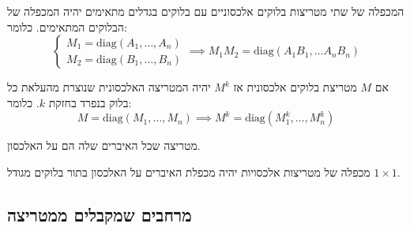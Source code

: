 \documentclass{tstextbook}
\begin{document}
\begin{proposition}
המכפלה של שתי מטריצות בלוקים אלכסוניים עם בלוקים בגדלים מתאימים יהיה המכפלה של הבלוקים המתאימים. כלומר:
$$\begin{cases}M_{1}=\mathrm{diag}\left( A_{1},\dots,A_{n} \right) \\M_{2} =\mathrm{diag}\left( B_{1},\dots, B_{n}\right)
\end{cases}\implies M_{1}M_{2}=\mathrm{diag}\left( A_{1}B_{1},\dots A_{n}B_{n} \right)$$

\end{proposition}
\begin{corollary}
אם \(M\) מטריצת בלוקים אלכסונית אז \(M^{k}\) יהיה המטריצה האלכסונית שנוצרת מהעלאת כל בלוק בנפרד בחזקת \(k\). כלומר:
$$M=\mathrm{diag}\left( M_{1},\dots ,M_{n} \right)\implies M^{k}=\mathrm{diag}\left( M_{1}^{k},\dots, M_{n}^{k} \right)$$

\end{corollary}
\begin{definition}
מטריצה שכל האיברים שלה הם על האלכסון.

\end{definition}
\begin{corollary}
מכפלה של מטריצות אלכסויות יהיה מכפלת האיברים על האלכסון בתור בלוקים מגודל \(1\times 1\).

\end{corollary}
\subsection{מרחבים שמקבלים ממטריצה}
\end{document}
